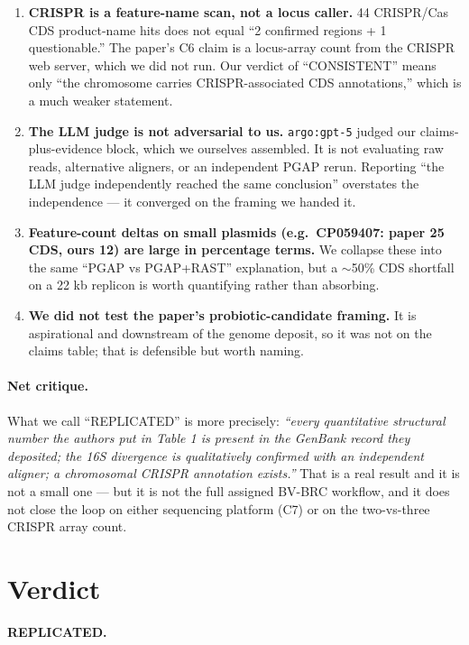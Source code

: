 \documentclass[11pt,letterpaper]{article}
\begin{document}
\begin{enumerate}[leftmargin=1.4em,itemsep=3pt]
  \item \textbf{CRISPR is a feature-name scan, not a locus caller.} 44 CRISPR/Cas CDS product-name hits does not equal ``2 confirmed regions + 1 questionable.'' The paper's C6 claim is a locus-array count from the CRISPR web server, which we did not run. Our verdict of ``CONSISTENT'' means only ``the chromosome carries CRISPR-associated CDS annotations,'' which is a much weaker statement.

  \item \textbf{The LLM judge is not adversarial to us.} \texttt{argo:gpt-5} judged our claims-plus-evidence block, which we ourselves assembled. It is not evaluating raw reads, alternative aligners, or an independent PGAP rerun. Reporting ``the LLM judge independently reached the same conclusion'' overstates the independence --- it converged on the framing we handed it.

  \item \textbf{Feature-count deltas on small plasmids (e.g.\ CP059407: paper 25 CDS, ours 12) are large in percentage terms.} We collapse these into the same ``PGAP vs PGAP+RAST'' explanation, but a $\sim$50\% CDS shortfall on a 22 kb replicon is worth quantifying rather than absorbing.

  \item \textbf{We did not test the paper's probiotic-candidate framing.} It is aspirational and downstream of the genome deposit, so it was not on the claims table; that is defensible but worth naming.
\end{enumerate}

\paragraph{Net critique.} What we call ``REPLICATED'' is more precisely: \emph{``every quantitative structural number the authors put in Table 1 is present in the GenBank record they deposited; the 16S divergence is qualitatively confirmed with an independent aligner; a chromosomal CRISPR annotation exists.''} That is a real result and it is not a small one --- but it is not the full assigned BV-BRC workflow, and it does not close the loop on either sequencing platform (C7) or on the two-vs-three CRISPR array count.

\section*{Verdict}
\textbf{REPLICATED.}
\end{document}
